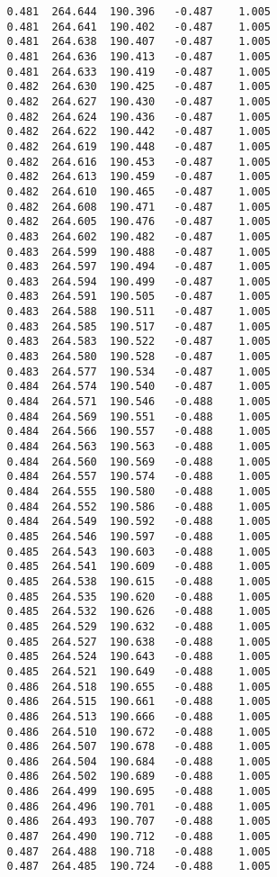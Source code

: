 \begin{verbatim}
   0.481  264.644  190.396   -0.487    1.005
   0.481  264.641  190.402   -0.487    1.005
   0.481  264.638  190.407   -0.487    1.005
   0.481  264.636  190.413   -0.487    1.005
   0.481  264.633  190.419   -0.487    1.005
   0.482  264.630  190.425   -0.487    1.005
   0.482  264.627  190.430   -0.487    1.005
   0.482  264.624  190.436   -0.487    1.005
   0.482  264.622  190.442   -0.487    1.005
   0.482  264.619  190.448   -0.487    1.005
   0.482  264.616  190.453   -0.487    1.005
   0.482  264.613  190.459   -0.487    1.005
   0.482  264.610  190.465   -0.487    1.005
   0.482  264.608  190.471   -0.487    1.005
   0.482  264.605  190.476   -0.487    1.005
   0.483  264.602  190.482   -0.487    1.005
   0.483  264.599  190.488   -0.487    1.005
   0.483  264.597  190.494   -0.487    1.005
   0.483  264.594  190.499   -0.487    1.005
   0.483  264.591  190.505   -0.487    1.005
   0.483  264.588  190.511   -0.487    1.005
   0.483  264.585  190.517   -0.487    1.005
   0.483  264.583  190.522   -0.487    1.005
   0.483  264.580  190.528   -0.487    1.005
   0.483  264.577  190.534   -0.487    1.005
   0.484  264.574  190.540   -0.487    1.005
   0.484  264.571  190.546   -0.488    1.005
   0.484  264.569  190.551   -0.488    1.005
   0.484  264.566  190.557   -0.488    1.005
   0.484  264.563  190.563   -0.488    1.005
   0.484  264.560  190.569   -0.488    1.005
   0.484  264.557  190.574   -0.488    1.005
   0.484  264.555  190.580   -0.488    1.005
   0.484  264.552  190.586   -0.488    1.005
   0.484  264.549  190.592   -0.488    1.005
   0.485  264.546  190.597   -0.488    1.005
   0.485  264.543  190.603   -0.488    1.005
   0.485  264.541  190.609   -0.488    1.005
   0.485  264.538  190.615   -0.488    1.005
   0.485  264.535  190.620   -0.488    1.005
   0.485  264.532  190.626   -0.488    1.005
   0.485  264.529  190.632   -0.488    1.005
   0.485  264.527  190.638   -0.488    1.005
   0.485  264.524  190.643   -0.488    1.005
   0.485  264.521  190.649   -0.488    1.005
   0.486  264.518  190.655   -0.488    1.005
   0.486  264.515  190.661   -0.488    1.005
   0.486  264.513  190.666   -0.488    1.005
   0.486  264.510  190.672   -0.488    1.005
   0.486  264.507  190.678   -0.488    1.005
   0.486  264.504  190.684   -0.488    1.005
   0.486  264.502  190.689   -0.488    1.005
   0.486  264.499  190.695   -0.488    1.005
   0.486  264.496  190.701   -0.488    1.005
   0.486  264.493  190.707   -0.488    1.005
   0.487  264.490  190.712   -0.488    1.005
   0.487  264.488  190.718   -0.488    1.005
   0.487  264.485  190.724   -0.488    1.005

\end{verbatim}
